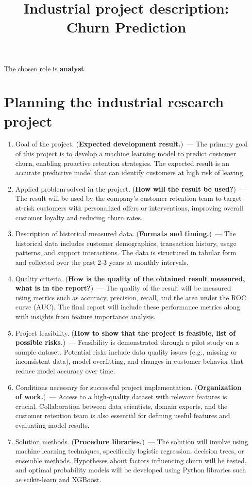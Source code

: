 \documentclass[12pt]{article}
\title{Industrial project description: Churn Prediction}
\date{}
\begin{document}
\maketitle

The chosen role is \textbf{analyst}.

\section{Planning the industrial research project}

\begin{enumerate}
\item Goal of the project. (\textbf{Expected development result.})~--- The primary goal of this project is to develop a machine learning model to predict customer churn, enabling proactive retention strategies. The expected result is an accurate predictive model that can identify customers at high risk of leaving.
\item Applied problem solved in the project. (\textbf{How will the result be used?})~--- The result will be used by the company's customer retention team to target at-risk customers with personalized offers or interventions, improving overall customer loyalty and reducing churn rates.
\item Description of historical measured data. (\textbf{Formats and timing.})~--- The historical data includes customer demographics, transaction history, usage patterns, and support interactions. The data is structured in tabular form and collected over the past 2-3 years at monthly intervals.
\item Quality criteria. (\textbf{How is the quality of the obtained result measured, what is in the report?})~--- The quality of the result will be measured using metrics such as accuracy, precision, recall, and the area under the ROC curve (AUC). The final report will include these performance metrics along with insights from feature importance analysis.
\item Project feasibility. (\textbf{How to show that the project is feasible, list of possible risks.})~--- Feasibility is demonstrated through a pilot study on a sample dataset. Potential risks include data quality issues (e.g., missing or inconsistent data), model overfitting, and changes in customer behavior that reduce model accuracy over time.
\item Conditions necessary for successful project implementation. (\textbf{Organization of work.})~--- Access to a high-quality dataset with relevant features is crucial. Collaboration between data scientists, domain experts, and the customer retention team is also essential for defining useful features and evaluating model results.
\item Solution methods. (\textbf{Procedure libraries.})~--- The solution will involve using machine learning techniques, specifically logistic regression, decision trees, or ensemble methods. Hypotheses about factors influencing churn will be tested, and optimal probability models will be developed using Python libraries such as scikit-learn and XGBoost.
\end{enumerate}
\end{document}

